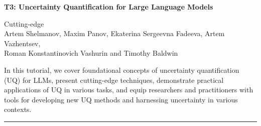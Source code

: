 \begin{center}
    \Large{\textbf{T3: Uncertainty Quantification for Large Language Models}\\}
    \par\bigskip
    \large{Cutting-edge}\\
    \large{Artem Shelmanov, Maxim Panov, Ekaterina Sergeevna Fadeeva, Artem Vazhentsev, \\
Roman Konstantinovich Vashurin and Timothy Baldwin}\\
    \par\bigskip

\end{center}

In this tutorial, we cover foundational concepts of uncertainty quantification (UQ) for LLMs, present cutting-edge techniques, demonstrate practical applications of UQ in various tasks, and equip researchers and practitioners with tools for developing new UQ methods and harnessing uncertainty in various contexts.
\begin{center}
    \noindent\rule{200px}{1pt}
\end{center}
